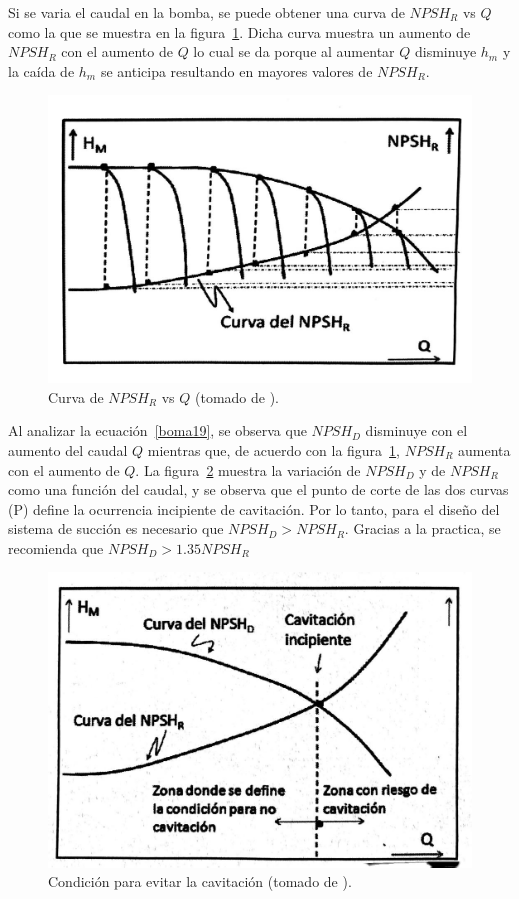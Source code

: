 \documentclass[11pt, oneside]{article}
\begin{document}
Si se varia el caudal en la bomba, se puede obtener una curva de $NPSH_R$ vs $Q$ como la que se muestra en la figura~\ref{bom20}. Dicha curva muestra un aumento de $NPSH_R$ con el aumento de $Q$ lo cual se da porque al aumentar $Q$ disminuye $h_m$ y la ca\'ida de $h_m$ se anticipa resultando en mayores valores de $NPSH_R$.  

\begin{figure}[h]
\centering
\includegraphics[width=12cm]{./figs/bom20.jpeg}
\caption{Curva de $NPSH_R$ vs $Q$ (tomado de \cite{agudelo2011mecanica}).} 
\label{bom20}
\end{figure}

Al analizar la ecuaci\'on~\ref{boma19}, se observa que $NPSH_D$ disminuye con el aumento del caudal $Q$ mientras que, de acuerdo con la figura~\ref{bom20}, $NPSH_R$ aumenta con el aumento de $Q$. La figura~\ref{bom21}  muestra la variaci\'on de $NPSH_D$ y de $NPSH_R$ como una funci\'on del caudal, y se observa que el punto de corte de las dos curvas (P) define la ocurrencia incipiente de cavitaci\'on. Por lo tanto, para el dise\~no del sistema de succi\'on es necesario que $NPSH_D > NPSH_R$. Gracias a la practica, se recomienda que $NPSH_D > 1.35 NPSH_R$

\begin{figure}[h]
\centering
\includegraphics[width=12cm]{./figs/bom21.jpeg}
\caption{Condici\'on para evitar la cavitaci\'on (tomado de \cite{agudelo2011mecanica}).} 
\label{bom21}
\end{figure}
\end{document}
